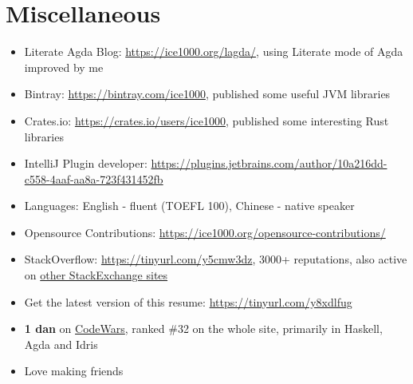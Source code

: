 \documentclass{resume}
\begin{document}

\section{Miscellaneous}
\begin{itemize}[parsep=0.25ex]
  \item Literate Agda Blog: \url{https://ice1000.org/lagda/}, using Literate mode of Agda improved by me
  \item Bintray: \url{https://bintray.com/ice1000}, published some useful JVM libraries
  \item Crates.io: \url{https://crates.io/users/ice1000}, published some interesting Rust libraries
  \item IntelliJ Plugin developer: \url{https://plugins.jetbrains.com/author/10a216dd-c558-4aaf-aa8a-723f431452fb}
  \item Languages: English - fluent (TOEFL 100), Chinese - native speaker
  \item Opensource Contributions: \url{https://ice1000.org/opensource-contributions/}
  \item StackOverflow: \url{https://tinyurl.com/y5cmw3dz},
    3000+ reputations, also active on \href{https://stackexchange.com/users/9532102/} {other StackExchange sites}
  \item Get the latest version of this resume: \url{https://tinyurl.com/y8xdlfug}
  \item \textbf{1 dan} on
    \href{https://www.codewars.com/users/ice1000} {CodeWars},
    ranked \#32 on the whole site, primarily in Haskell, Agda and Idris
  \item Love making friends
\end{itemize}

%
%
\end{document}
